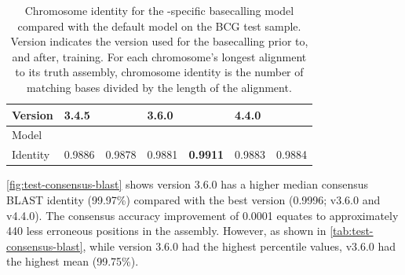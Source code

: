 \begin{table}
\centering
\begin{tabular}{@{}lllllll@{}}
\toprule
Version  & \multicolumn{2}{l}{3.4.5} & \multicolumn{2}{l}{3.6.0} & \multicolumn{2}{l}{4.4.0} \\ \midrule
Model    & \guppy{}       & \tubby{}       & \guppy{}        & \tubby{}       & \guppy{}        & \tubby{}       \\
Identity & 0.9886      & 0.9878      & 0.9881      & \textbf{0.9911}      & 0.9883      & 0.9884      \\ \bottomrule
\end{tabular}
\caption{Chromosome identity for the \mtb{}-specific basecalling model \tubby{} compared with the default \guppy{} model on the BCG test sample. Version indicates the \guppy{} version used for the basecalling prior to, and after, training. For each chromosome's longest alignment to its truth assembly, chromosome identity is the number of matching bases divided by the length of the alignment.}
\label{tab:test-chrom-identity}
\end{table}

\autoref{fig:test-consensus-blast} shows \tubby{} version 3.6.0 has a higher median consensus BLAST identity (99.97\%) compared with the best \guppy{} version (0.9996; v3.6.0 and v4.4.0). The consensus accuracy improvement of 0.0001 equates to approximately 440 less erroneous positions in the \mtb{} assembly. However, as shown in \autoref{tab:test-consensus-blast}, while \tubby{} version 3.6.0 had the highest percentile values, \guppy{} v3.6.0 had the highest mean (99.75\%).

